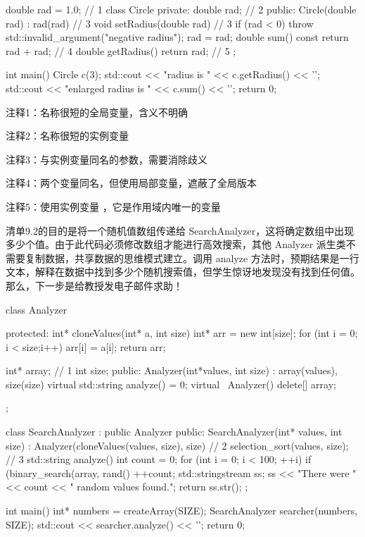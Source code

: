 \begin{cpp}
double rad = 1.0; // 1
class Circle {
private:
  double rad; // 2
public:
  Circle(double rad) : rad(rad) {} // 3
  void setRadius(double rad) { // 3
    if (rad < 0)
      throw std::invalid_argument("negative radius");
    rad = rad;
  }
  double sum() const {
    return rad + rad; // 4
  }
  double getRadius() { return rad; } // 5
};

int main() {
  Circle c(3);
  std::cout << "radius is " << c.getRadius() << '\n';
  std::cout << "enlarged radius is " << c.sum() << '\n';
  return 0;
}
\end{cpp}

{\footnotesize
注释1：名称很短的全局变量，含义不明确

注释2：名称很短的实例变量

注释3：与实例变量同名的参数，需要消除歧义

注释4：两个变量同名，但使用局部变量，遮蔽了全局版本

注释5：使用实例变量 ，它是作用域内唯一的变量
}

清单9.2的目的是将一个随机值数组传递给 SearchAnalyzer，这将确定数组中出现多少个值。由于此代码必须修改数组才能进行高效搜索，其他 Analyzer 派生类不需要复制数据，共享数据的思维模式建立。调用 analyze 方法时，预期结果是一行文本，解释在数据中找到多少个随机搜索值，但学生惊讶地发现没有找到任何值。那么，下一步是给教授发电子邮件求助！


\begin{cpp}
class Analyzer{
protected:
  int* cloneValues(int* a, int size){
    int* arr = new int[size];
    for (int i = 0; i < size;i++)
    arr[i] = a[i];
    return arr;
  }

  int* array; // 1
  int size;
public:
  Analyzer(int*values, int size) : array(values), size(size) {}
  virtual std::string analyze() = 0;
  virtual ~Analyzer() { delete[] array; }
};

class SearchAnalyzer : public Analyzer{
public:
  SearchAnalyzer(int* values, int size) : Analyzer(cloneValues(values,
      size), size) { // 2
    selection_sort(values, size); // 3
  }
  std::string analyze() {
    int count = 0;
    for (int i = 0; i < 100; ++i)
      if (binary_search(array, rand() %
        ++count;
    std::stringstream ss;
    ss << "There were "<< count << " random values found.";
    return ss.str();
  }
};

int main() {
  int* numbers = createArray(SIZE);
  SearchAnalyzer searcher(numbers, SIZE);
  std::cout << searcher.analyze() << '\n';
  return 0;
}
\end{cpp}

